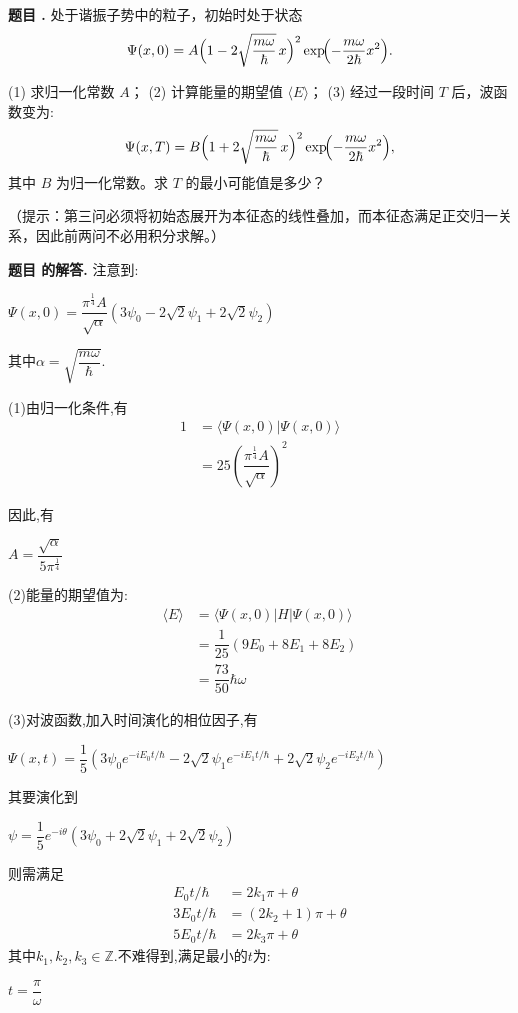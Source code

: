 \documentclass[12pt, a4paper, oneside]{ctexart}
\newcounter{problemname}
\newenvironment{problem}
  {\begin{shaded}\stepcounter{problemname}\par\noindent\textbf{题目 \theproblemname. }}
  {\end{shaded}\par}
\newenvironment{solution}
  {\par\noindent\textbf{题目 \theproblemname 的解答. }}
  {\par}
\begin{document}
\begin{problem}
  处于谐振子势中的粒子，初始时处于状态
\[
\Psi(x,0)=A\Bigl(1-2\sqrt{\dfrac{m\omega}{\hbar}}\,x\Bigr)^2
\exp\!\Bigl(-\dfrac{m\omega}{2\hbar}x^2\Bigr).
\]


  (1) 求归一化常数 \(A\)；
  (2) 计算能量的期望值 \(\langle E\rangle\)；
  (3) 经过一段时间 \(T\) 后，波函数变为:
  \[
  \Psi(x,T)=B\Bigl(1+2\sqrt{\dfrac{m\omega}{\hbar}}\,x\Bigr)^2\exp\!\Bigl(-\dfrac{m\omega}{2\hbar}x^2\Bigr),
  \]
  其中 \(B\) 为归一化常数。求 \(T\) 的最小可能值是多少？


（提示：第三问必须将初始态展开为本征态的线性叠加，而本征态满足正交归一关系，因此前两问不必用积分求解。）

  
\end{problem}

\begin{solution}
  注意到:

  \centerline{$\Psi(x,0) =  \dfrac{\pi^{\frac{1}{4}}A}{\sqrt{\alpha}} \left(3\psi_0 -2\sqrt{2}\psi_1 + 2\sqrt{2}\psi_2\right)$}

  其中$\alpha = \sqrt{\dfrac{m\omega}{\hbar}}$.

  (1)由归一化条件,有
  \begin{align*}
    1 &= \langle \Psi(x,0) | \Psi(x,0) \rangle \\
    &= 25 \left(\dfrac{\pi^{\frac{1}{4}}A}{\sqrt{\alpha}}\right)^2
  \end{align*}

  因此,有

  \centerline{$A = \dfrac{\sqrt{\alpha}}{5\pi^{\frac{1}{4}}}$}

  (2)能量的期望值为:
  \begin{align*}
    \langle E \rangle &= \langle \Psi(x,0) | H | \Psi(x,0) \rangle \\
    &= \dfrac{1}{25}(9 E_0 + 8 E_1 + 8 E_2) \\
    &= \dfrac{73}{50} \hbar\omega
  \end{align*}

  (3)对波函数,加入时间演化的相位因子,有

  \centerline{$\Psi(x,t) = \dfrac{1}{5} (3\psi_0 e^{-iE_0t/\hbar} - 2\sqrt{2} \psi_1 e^{-iE_1t/\hbar} + 2\sqrt{2} \psi_2 e^{-iE_2t/\hbar})$}

  其要演化到

  \centerline{$\psi = \dfrac{1}{5}e^{-i\theta} \left(3\psi_0 +2\sqrt{2}\psi_1 + 2\sqrt{2}\psi_2\right)$}

  则需满足
  \begin{align*}
    E_0t/\hbar &= 2k_1 \pi+\theta\\
    3E_0t/\hbar &= (2k_2+1) \pi+\theta\\
    5E_0t/\hbar &= 2k_3 \pi+\theta
  \end{align*}
  其中$k_1,k_2,k_3 \in \mathbb{Z}$.不难得到,满足最小的$t$为:

  \centerline{$t = \dfrac{\pi}{\omega}$}
\end{solution}
\end{document}
